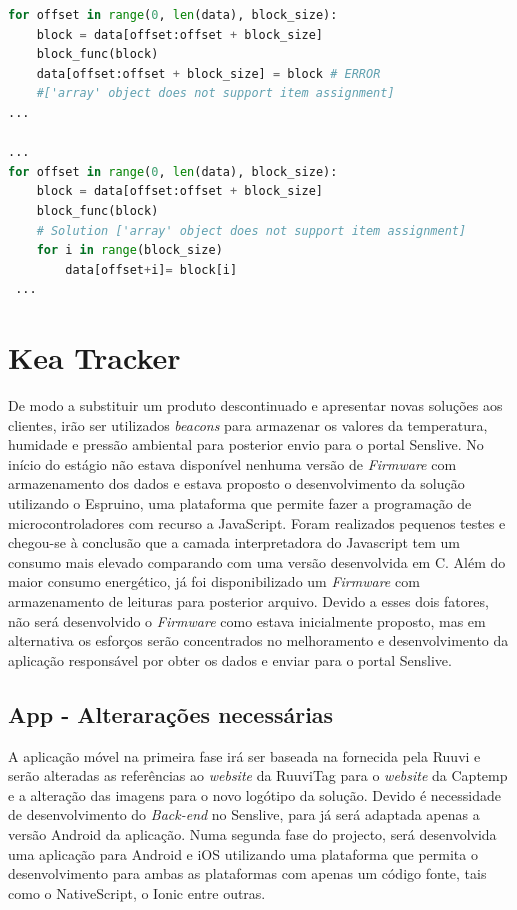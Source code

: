 \begin{lstlisting}[caption=Adaptação do Código para o equipamento Digi,label={py2},language=Python]
for offset in range(0, len(data), block_size):
    block = data[offset:offset + block_size]
    block_func(block)
    data[offset:offset + block_size] = block # ERROR 
    #['array' object does not support item assignment]
...

...
for offset in range(0, len(data), block_size):
    block = data[offset:offset + block_size]
    block_func(block)
    # Solution ['array' object does not support item assignment]
    for i in range(block_size)
        data[offset+i]= block[i]
 ...
\end{lstlisting}

\section {Kea Tracker}

\par De modo a substituir um produto descontinuado e apresentar novas soluções aos clientes, irão ser utilizados \textit{beacons} para armazenar os valores da temperatura, humidade e pressão ambiental para posterior envio para o portal Senslive. No início do estágio não estava disponível nenhuma versão de \textit{Firmware} com armazenamento dos dados e estava proposto o desenvolvimento da solução utilizando o Espruino, uma plataforma que permite fazer a programação de microcontroladores com recurso a JavaScript. Foram realizados pequenos testes e chegou-se à conclusão que a camada interpretadora do Javascript tem um consumo mais elevado comparando com uma versão desenvolvida em C. Além do maior consumo energético, já foi disponibilizado um \textit{Firmware} com armazenamento de leituras para posterior arquivo. Devido a esses dois fatores, não será desenvolvido o \textit{Firmware} como estava inicialmente proposto, mas em alternativa os esforços serão concentrados no melhoramento e desenvolvimento da aplicação responsável por obter os dados e enviar para o portal Senslive. 


\subsection{App - Alterarações necessárias}

\par A aplicação móvel na primeira fase irá ser baseada na fornecida pela Ruuvi e serão alteradas as referências ao \textit{website} da RuuviTag para o \textit{website} da Captemp e a alteração das imagens para o novo logótipo da solução. Devido é necessidade de desenvolvimento do \textit{Back-end} no Senslive, para já será adaptada apenas a versão Android da aplicação. Numa segunda fase do projecto, será desenvolvida uma aplicação para Android e iOS utilizando uma plataforma que permita o desenvolvimento para ambas as plataformas com apenas um código fonte, tais como o NativeScript\cite{nativescript}, o Ionic\cite{ionic} entre outras.


